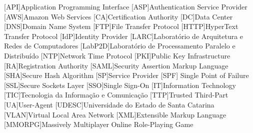 

\begin{acronym}%
[API]{Application Programming Interface}
[ASP]{Authentication Service Provider}
[AWS]{Amazon Web Services}
[CA]{Certification Authority}
[DC]{Data Center}
[DNS]{Domain Name System}
[FTP]{File Transfer Protocol}
[HTTP]{HyperText Transfer Protocol}
[IdP]{Identity Provider}
[LARC]{Laborat\'{o}rio de Arquitetura e Redes de Computadores}
[LabP2D]{Laborat\'{o}rio de Processamento Paralelo e Distribu\'{i}do}
[NTP]{Network Time Protocol}
[PKI]{Public Key Infrastructure}
[RA]{Registration Authority}
[SAML]{Security Assertion Markup Language}
[SHA]{Secure Hash Algorithm}
[SP]{Service Provider}
[SPF] {Single Point of Failure}
[SSL]{Secure Sockets Layer}
[SSO]{Single Sign-On}
[IT]{Information Technology}
[TIC]{Tecnologia da Informa\c{c}\~{a}o e Comunica\c{c}\~{a}o}
[TTP]{Trusted Third-Part}
[UA]{User-Agent}
[UDESC]{Universidade do Estado de Santa Catarina}
[VLAN]{Virtual Local Area Network}
[XML]{Extensible Markup Language}
[MMORPG]{Massively Multiplayer Online Role-Playing Game}
\end{acronym}%
